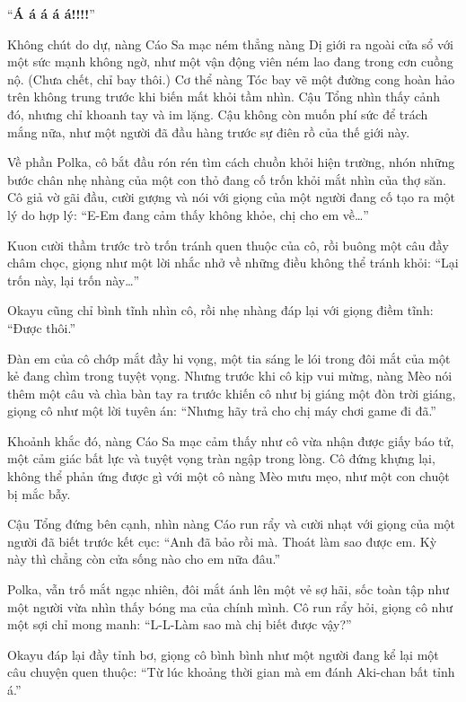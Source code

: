 \documentclass[../main.tex]{subfiles}
\begin{document}
``\textbf{Á á á á á!!!!}''

Không chút do dự, nàng Cáo Sa mạc ném thẳng nàng Dị giới ra ngoài cửa sổ với một sức mạnh không ngờ, như một vận động viên ném lao đang trong cơn cuồng nộ. (Chưa chết, chỉ bay thôi.) Cơ thể nàng Tóc bay vẽ một đường cong hoàn hảo trên không trung trước khi biến mất khỏi tầm nhìn. Cậu Tổng nhìn thấy cảnh đó, nhưng chỉ khoanh tay và im lặng. Cậu không còn muốn phí sức để trách mắng nữa, như một người đã đầu hàng trước sự điên rồ của thế giới này.


Về phần Polka, cô bắt đầu rón rén tìm cách chuồn khỏi hiện trường, nhón những bước chân nhẹ nhàng của một con thỏ đang cố trốn khỏi mắt nhìn của thợ săn. Cô giả vờ gãi đầu, cười gượng và nói với giọng của một người đang cố tạo ra một lý do hợp lý: ``E-Em đang cảm thấy không khỏe, chị cho em về\dots''

Kuon cười thầm trước trò trốn tránh quen thuộc của cô, rồi buông một câu đầy châm chọc, giọng như một lời nhắc nhở về những điều không thể tránh khỏi: ``Lại trốn này, lại trốn này\dots''

Okayu cũng chỉ bình tĩnh nhìn cô, rồi nhẹ nhàng đáp lại với giọng điềm tĩnh: ``Được thôi.''

Đàn em của cô chớp mắt đầy hi vọng, một tia sáng le lói trong đôi mắt của một kẻ đang chìm trong tuyệt vọng. Nhưng trước khi cô kịp vui mừng, nàng Mèo nói thêm một câu và chìa bàn tay ra trước khiến cô như bị giáng một đòn trời giáng, giọng cô như một lời tuyên án: ``Nhưng hãy trả cho chị máy chơi game đi đã.''

Khoảnh khắc đó, nàng Cáo Sa mạc cảm thấy như cô vừa nhận được giấy báo tử, một cảm giác bất lực và tuyệt vọng tràn ngập trong lòng. Cô đứng khựng lại, không thể phản ứng được gì với một cô nàng Mèo mưu mẹo, như một con chuột bị mắc bẫy.

Cậu Tổng đứng bên cạnh, nhìn nàng Cáo run rẩy và cười nhạt với giọng của một người đã biết trước kết cục: ``Anh đã bảo rồi mà. Thoát làm sao được em. Kỳ này thì chẳng còn cửa sống nào cho em nữa đâu.''

Polka, vẫn trố mắt ngạc nhiên, đôi mắt ánh lên một vẻ sợ hãi, sốc toàn tập như một người vừa nhìn thấy bóng ma của chính mình. Cô run rẩy hỏi, giọng cô như một sợi chỉ mong manh: ``L-L-Làm sao mà chị biết được vậy?''

Okayu đáp lại đầy tỉnh bơ, giọng cô bình bình như một người đang kể lại một câu chuyện quen thuộc: ``Từ lúc khoảng thời gian mà em đánh Aki-chan bất tỉnh á.''
\end{document}
